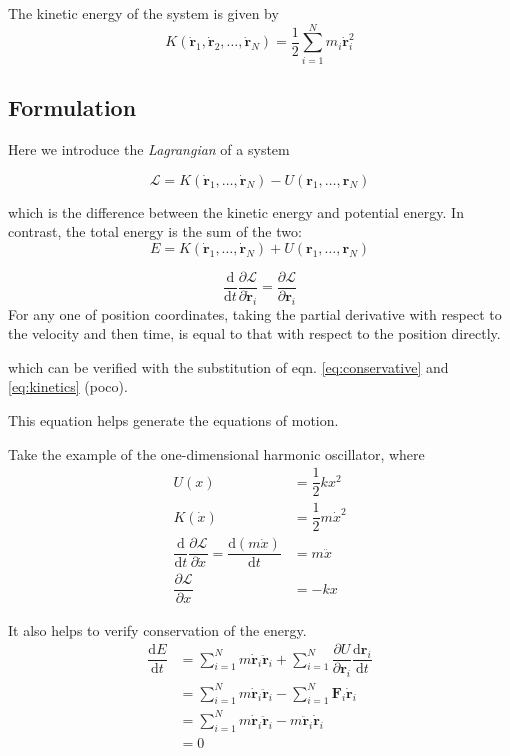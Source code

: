 \documentclass[
  10pt,
  twoside,
  openany,
  b5paper, %
  colorscheme = bootstrap-v4, %
]{qyxf-book}
\numberwithin{equation}{section}
\newcommand{\md}{\mathrm{d}}
\newcommand{\der}[2]{\dfrac{\md #1}{\md #2}}
\newcommand{\p}[2]{\dfrac{\partial #1}{\partial #2}}
\newcommand{\vF}{\boldsymbol{F}}
\newcommand{\vr}{\boldsymbol{r}}
\newcommand{\dvr}{\dot{\vr}}
\newcommand{\ddvr}{\ddot{\vr}}
\newcommand{\half}{\dfrac{1}{2}}
\newcommand{\sumin}{\sum_{i=1}^N}
\newcommand{\lag}{\mathcal{L}} %
\begin{document}
The kinetic energy of the system is given by
\begin{equation}
	K(\dvr_1, \dvr_2, \dots, \dvr_N)=\half\sum_{i=1}^{N}m_i\dvr_i^2 \label{eq:kinetics}
\end{equation}

\subsection{Formulation}
Here we introduce the \textit{Lagrangian} of a system
\begin{tcolorbox}
	\begin{equation}
		\lag=K(\dvr_1, \dots, \dvr_N)-U(\vr_1, \dots, \vr_N)
	\end{equation}
\end{tcolorbox}
which is the difference between the kinetic energy and potential energy. In contrast, the total energy is the sum of the two:
\begin{equation}
	E=K(\dvr_1, \dots, \dvr_N)+U(\vr_1, \dots, \vr_N)
\end{equation}

\begin{tcolorbox}[title={The Euler-Lagrange equation}]
	\begin{equation}
		\der{}{t}\p{\lag}{\dvr_i}=\p{\lag}{\vr_i} \label{eq:euler-lagrange}
	\end{equation}
	For any one of position coordinates, taking the partial derivative with respect to the velocity and then time, is equal to that with respect to the position directly.
\end{tcolorbox}
which can be verified with the substitution of eqn. \ref{eq:conservative} and \ref{eq:kinetics} (poco).

This equation helps generate the equations of motion. 

\example
Take the example of the one-dimensional harmonic oscillator, where
\begin{align*}
	U(x)&=\half kx^2\\
	K(\dot{x})&=\half m\dot{x}^2\\
	\der{}{t}\p{\lag}{\dot{x}}=\der{(m\dot{x})}{t}&=m\ddot{x}\\
	\p{\lag}{x}&=-kx
\end{align*}

It also helps to verify conservation of the energy.
\begin{align*}
	\der{E}{t}&=\sumin m\dvr_i\ddvr_i+\sumin\p{U}{\vr_i}\der{\vr_i}{t}\\
	&=\sumin m\dvr_i\ddvr_i-\sumin\vF_i\dvr_i\\
	&=\sumin m\dvr_i\ddvr_i-m\ddvr_i\dvr_i\\
	&=0
\end{align*}
\end{document}
